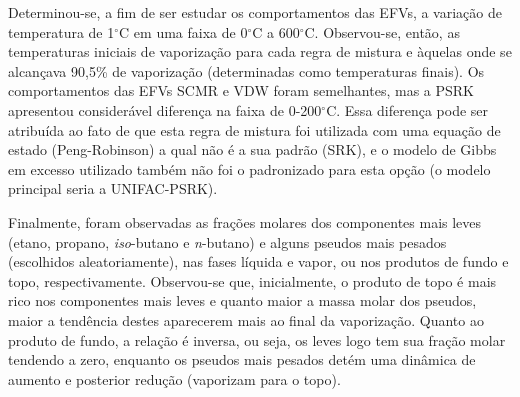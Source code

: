Determinou-se, a fim de ser estudar os comportamentos das EFVs, a variação de 
temperatura de 1$^\circ$C em uma faixa de 0$^\circ$C a 600$^\circ$C.
Observou-se, então, as temperaturas iniciais de vaporização para cada regra de mistura e àquelas 
onde se alcançava 90,5{\%} de vaporização (determinadas como temperaturas
finais).
Os comportamentos das EFVs SCMR e VDW foram semelhantes, mas a PSRK apresentou 
considerável diferença na faixa de 0-200$^\circ$C. Essa diferença pode ser
atribuída ao fato de que esta regra de mistura foi utilizada com uma equação de estado 
(Peng-Robinson) a qual não é a sua padrão (SRK), e o modelo de Gibbs em excesso 
utilizado também não foi o padronizado para esta opção (o modelo principal seria 
a UNIFAC-PSRK).

Finalmente, foram observadas as frações molares dos componentes mais leves 
(etano, propano, \emph{iso}-butano e \emph{n}-butano) e alguns pseudos mais pesados 
(escolhidos aleatoriamente), nas fases líquida e vapor, ou nos produtos de 
fundo e topo, respectivamente. Observou-se que, inicialmente, o produto de 
topo é mais rico nos componentes mais leves e quanto maior a massa molar dos 
pseudos, maior a tendência destes aparecerem mais ao final da vaporização. 
Quanto ao produto de fundo, a relação é inversa, ou seja, os leves logo tem 
sua fração molar tendendo a zero, enquanto os pseudos mais pesados detém uma 
dinâmica de aumento e posterior redução (vaporizam para o topo).
